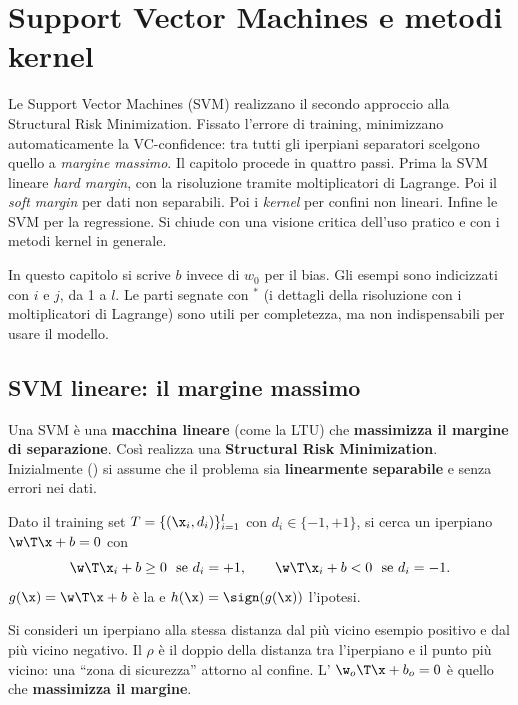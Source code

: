 \chapter{Support Vector Machines e metodi kernel}
\label{cap:svm}



\begin{inbreve}
Le Support Vector Machines (SVM) realizzano il secondo approccio alla Structural Risk Minimization. Fissato
l'errore di training, minimizzano automaticamente la VC-confidence: tra tutti gli iperpiani separatori scelgono
quello a \emph{margine massimo}. Il capitolo procede in quattro passi. Prima la SVM lineare \emph{hard margin}, con
la risoluzione tramite moltiplicatori di Lagrange. Poi il \emph{soft margin} per dati non separabili. Poi i
\emph{kernel} per confini non lineari. Infine le SVM per la regressione. Si chiude con una visione critica dell'uso
pratico e con i metodi kernel in generale.
\end{inbreve}

\begin{attenzione}[Notazione]
In questo capitolo si scrive $b$ invece di $w_0$ per il bias. Gli esempi sono indicizzati con $i$ e $j$, da 1 a
$l$. Le parti segnate con $^*$ (i dettagli della risoluzione con i moltiplicatori di Lagrange) sono utili per
completezza, ma non indispensabili per usare il modello.
\end{attenzione}

\section{SVM lineare: il margine massimo}

Una SVM è una \textbf{macchina lineare} (come la LTU) che \textbf{massimizza il margine di separazione}. Così
realizza una \textbf{Structural Risk Minimization}. Inizialmente () si assume che il problema
sia \textbf{linearmente separabile} e senza errori nei dati.

Dato il training set $T = \{(\x_i,d_i)\}_{i=1}^{l}$ con $d_i\in\{-1,+1\}$, si cerca un iperpiano $\w\T\x+b=0$ con
\[
\w\T\x_i + b\ge0\ \text{ se } d_i=+1,\qquad \w\T\x_i+b<0\ \text{ se } d_i=-1 .
\]
$g(\x) = \w\T\x+b$ è la  e $h(\x) = \sign(g(\x))$ l'ipotesi.

\begin{definizione}
Si consideri un iperpiano alla stessa distanza dal più vicino esempio positivo e dal più vicino negativo. Il
 $\rho$ è il doppio della distanza tra l'iperpiano e il punto più vicino: una
``zona di sicurezza'' attorno al confine. L' $\w_o\T\x+b_o=0$ è quello che
\textbf{massimizza il margine}.
\end{definizione}

